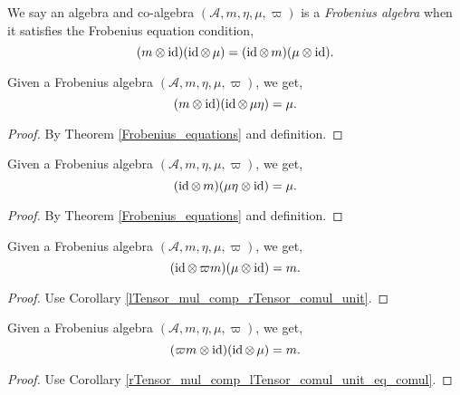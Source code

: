  \begin{definition}\label{FrobeniusAlgebra}\leanok
  We say an algebra and co-algebra $(\mathcal{A},m,\eta,\mu,\varpi)$ is a \textit{Frobenius algebra} when it satisfies the Frobenius equation condition,
  \[(m\otimes\operatorname{id})(\operatorname{id}\otimes\,\mu)=(\operatorname{id}\otimes\,m)(\mu\otimes\operatorname{id}).\]
 \end{definition}

 \begin{corollary}\label{rTensor_mul_comp_lTensor_comul_unit_eq_comul}
  \leanok
  Given a Frobenius algebra $(\mathcal{A},m,\eta,\mu,\varpi)$, we get,
  \[(m\otimes\operatorname{id})(\operatorname{id}\otimes\,\mu\eta)=\mu.\]
 \end{corollary}
 \begin{proof}\leanok
  By Theorem \ref{Frobenius_equations} and definition.
 \end{proof}

 \begin{corollary}\label{lTensor_mul_comp_rTensor_comul_unit}
  \leanok
  Given a Frobenius algebra $(\mathcal{A},m,\eta,\mu,\varpi)$, we get,
  \[(\operatorname{id}\otimes\,m)(\mu{\eta}\otimes\operatorname{id})=\mu.\]
 \end{corollary}
 \begin{proof}\leanok
  By Theorem \ref{Frobenius_equations} and definition.
 \end{proof}

 \begin{corollary}\label{lTensor_counit_mul_comp_rTensor_comul}
  \leanok
  Given a Frobenius algebra $(\mathcal{A},m,\eta,\mu,\varpi)$, we get,
  \[(\operatorname{id}\otimes\,\varpi m)(\mu\otimes\operatorname{id})=m.\]
 \end{corollary}
 \begin{proof}\leanok
  Use Corollary \ref{lTensor_mul_comp_rTensor_comul_unit}.
 \end{proof}
 \begin{corollary}\label{rTensor_counit_mul_comp_lTensor_comul}
  \leanok
  Given a Frobenius algebra $(\mathcal{A},m,\eta,\mu,\varpi)$, we get,
  \[(\varpi m\otimes\operatorname{id})(\operatorname{id}\otimes\,\mu)=m.\]
 \end{corollary}
 \begin{proof}\leanok
  Use Corollary \ref{rTensor_mul_comp_lTensor_comul_unit_eq_comul}.
 \end{proof}

